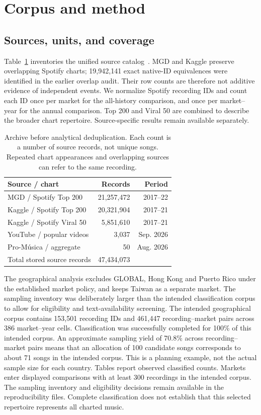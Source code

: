 \documentclass[10pt,a4paper,twocolumn]{article}
\begin{document}
\section{Corpus and method}
\subsection{Sources, units, and coverage}
Table~\ref{tab:sources} inventories the unified source catalog~\cite{archive}. MGD and Kaggle preserve overlapping Spotify charts; 19,942,141 exact native-ID equivalences were identified in the earlier overlap audit. Their row counts are therefore not additive evidence of independent events. We normalize Spotify recording IDs and count each ID once per market for the all-history comparison, and once per market--year for the annual comparison. Top 200 and Viral 50 are combined to describe the broader chart repertoire. Source-specific results remain available separately.

\begin{table}[t]
\caption{Archive before analytical deduplication. Each count is a number of source records, not unique songs. Repeated chart appearances and overlapping sources can refer to the same recording.}
\label{tab:sources}
\centering\footnotesize\setlength{\tabcolsep}{3pt}
\begin{tabularx}{\columnwidth}{@{}Xrr@{}}
\toprule Source / chart & Records & Period \\
\midrule
MGD / Spotify Top 200 & 21,257,472 & 2017--22 \\
Kaggle / Spotify Top 200 & 20,321,904 & 2017--21 \\
Kaggle / Spotify Viral 50 & 5,851,610 & 2017--21 \\
YouTube / popular videos & 3,037 & Sep. 2026 \\
Pro-M\'usica / aggregate & 50 & Aug. 2026 \\
\midrule Total stored source records & 47,434,073 & \\
\bottomrule
\end{tabularx}
\end{table}

The geographical analysis excludes GLOBAL, Hong Kong and Puerto Rico under the established market policy, and keeps Taiwan as a separate market. The sampling inventory was deliberately larger than the intended classification corpus to allow for eligibility and text-availability screening. The intended geographical corpus contains 153,501 recording IDs and 461,447 recording--market pairs across 386 market--year cells. Classification was successfully completed for 100\% of this intended corpus. An approximate sampling yield of 70.8\% across recording--market pairs means that an allocation of 100 candidate songs corresponds to about 71 songs in the intended corpus. This is a planning example, not the actual sample size for each country. Tables report observed classified counts. Markets enter displayed comparisons with at least 300 recordings in the intended corpus. The sampling inventory and eligibility decisions remain available in the reproducibility files. Complete classification does not establish that this selected repertoire represents all charted music.
\end{document}
